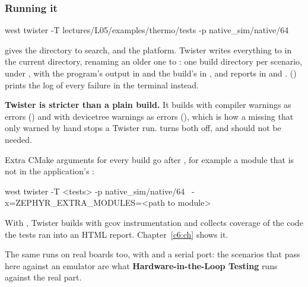 \subsubsection{Running it}
\begin{shell}
west twister -T lectures/L05/examples/thermo/tests -p native_sim/native/64
\end{shell}

 gives the directory to search, and  the platform. Twister writes everything to
 in the current directory, renaming an older one to : one
build directory per scenario, under
, with the program’s output in
 and the build’s in , and reports in
 and .  () prints the
log of every failure in the terminal instead.

\textbf{Twister is stricter than a plain build.} It builds with compiler warnings as errors
() and with devicetree warnings as errors
(), which is how a missing  that only warned by hand
stops a Twister run.  turns both off, and should not be needed.

Extra CMake arguments for every build go after , for example a module that is not in the
application’s :

\begin{shell}
west twister -T <tests> -p native_sim/native/64 \
    -x=ZEPHYR_EXTRA_MODULES=<path to module>
\end{shell}

\noindent With , Twister builds with gcov instrumentation and collects coverage of
the code the tests ran into an HTML report. Chapter~\ref{c6:ch} shows it.

The same  runs on real boards too, with  and a serial
port: the scenarios that pass here against an emulator are what \textbf{Hardware-in-the-Loop
Testing} runs against the real part.

